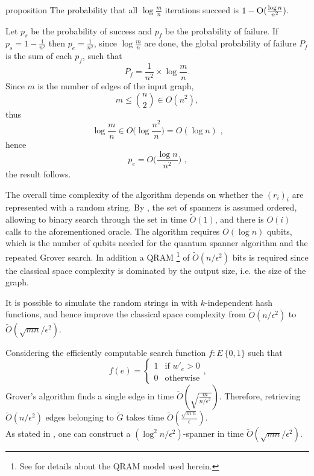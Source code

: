 \begin{theoremEnd}{proposition}
The probability that all $\log \frac mn$ iterations succeed is $1 - \textsc{O}(
\frac{\log n}{n^2})$. 
\end{theoremEnd}
\begin{proofEnd}
Let $p_s$ be the probability of success and $p_f$ be the probability of failure.
If $p_s = 1-\frac{1}{n^2}$ then $p_e = \frac{1}{n^2}$, since $\log \frac{m}{n}$ are done,
the global probability of failure $P_f$ is the sum of each $p_f$, such that 
$$P_f = \frac{1}{n^2} \times \log \frac{m}{n}.$$ 
Since $m$ is the number of edges of the input graph, 
$$m \leq \binom{n}{2}\in O(n^2),$$
thus 
$$\log \frac mn \in O\big(\log \frac{n^2}{n}\big) = O(\log n)\text{ ,}$$
hence
$$p_e = O\big(\frac{\log n}{n^2}\big)\text{ ,}$$
the result follows.
\end{proofEnd}

The overall time complexity of the algorithm depends on whether the $(r_i)_i$ are 
represented with a random string. By , the set of spanners is assumed ordered, 
allowing to binary search through the set in time $\tilde{O}(1)$, and there is $O(i)$ calls to the aforementioned oracle. The algorithm requires $O(\log n)$ qubits, which is the number of qubits needed
for the quantum spanner algorithm and the repeated Grover search. In addition a QRAM \footnote{See  for details about the QRAM model used herein.}
of $\tilde{O}(n/\epsilon^2)$ bits is required since the classical space complexity is dominated
by the output size, i.e. the size of the graph.


It is possible to simulate the random strings in
 with $k$-independent hash functions, and hence improve the classical space complexity from
$\tilde{O}(n/\epsilon^2)$ to $\tilde{O}(\sqrt{mn}/\epsilon^2)$.


Considering the efficiently computable search function $f : E \> \{0,1\}$
such that 
\begin{equation*}
       f(e) = \begin{cases}
       1  & \text{if } w'_e >0 \\ 
       0 & \text{otherwise}
       \end{cases}  
    \text{,}
\end{equation*}
Grover's algorithm finds a single edge in time $\tilde{O}(\sqrt{\frac{m}{n/\epsilon^2}})$. Therefore, retrieving $\tilde{O}(n/\epsilon^2)$ edges
belonging to $\tilde{G}$ takes time $\tilde{O}(\frac{\sqrt{m\,n}}{\epsilon})$. \\ 
As stated in , one can construct a $(\log^2 n / \epsilon^2)$-spanner in time $\tilde{O}(\sqrt{mn}/\epsilon^2)$. 


